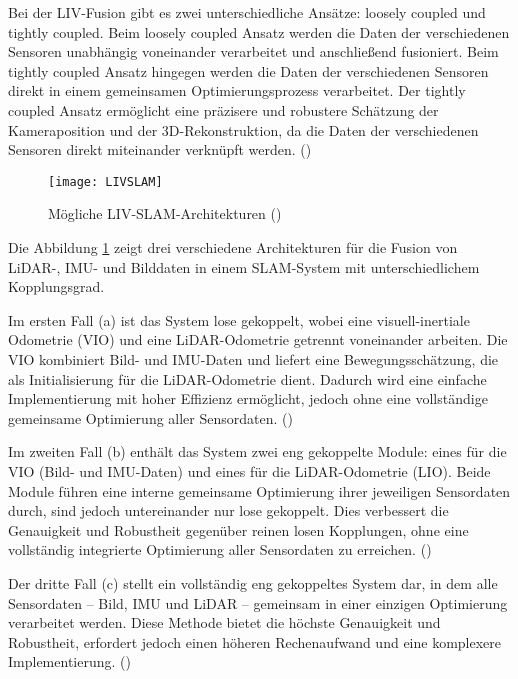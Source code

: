 Bei der LIV-Fusion gibt es zwei unterschiedliche Ansätze: loosely coupled und tightly coupled. Beim loosely coupled Ansatz werden die Daten der verschiedenen Sensoren unabhängig voneinander verarbeitet und anschließend fusioniert. Beim tightly coupled Ansatz hingegen werden die Daten der verschiedenen Sensoren direkt in einem gemeinsamen Optimierungsprozess verarbeitet. Der tightly coupled Ansatz ermöglicht eine präzisere und robustere Schätzung der Kameraposition und der 3D-Rekonstruktion, da die Daten der verschiedenen Sensoren direkt miteinander verknüpft werden. (\cite{zhang2024lidarslam})

\begin{figure}
    \centering
    \texttt{[image: LIVSLAM]}
    \caption{Mögliche LIV-SLAM-Architekturen (\cite{zhang2024lidarslam})\label{fig:LIVSLAM}}\par
\end{figure}

Die Abbildung \ref{fig:LIVSLAM} zeigt drei verschiedene Architekturen für die Fusion von LiDAR-, IMU- und Bilddaten in einem SLAM-System mit unterschiedlichem Kopplungsgrad.

Im ersten Fall (a) ist das System lose gekoppelt, wobei eine visuell-inertiale Odometrie (VIO) und eine LiDAR-Odometrie getrennt voneinander arbeiten. Die VIO kombiniert Bild- und IMU-Daten und liefert eine Bewegungsschätzung, die als Initialisierung für die LiDAR-Odometrie dient. Dadurch wird eine einfache Implementierung mit hoher Effizienz ermöglicht, jedoch ohne eine vollständige gemeinsame Optimierung aller Sensordaten. (\cite{zhang2024lidarslam})

Im zweiten Fall (b) enthält das System zwei eng gekoppelte Module: eines für die VIO (Bild- und IMU-Daten) und eines für die LiDAR-Odometrie (LIO). Beide Module führen eine interne gemeinsame Optimierung ihrer jeweiligen Sensordaten durch, sind jedoch untereinander nur lose gekoppelt. Dies verbessert die Genauigkeit und Robustheit gegenüber reinen losen Kopplungen, ohne eine vollständig integrierte Optimierung aller Sensordaten zu erreichen. (\cite{zhang2024lidarslam})

Der dritte Fall (c) stellt ein vollständig eng gekoppeltes System dar, in dem alle Sensordaten – Bild, IMU und LiDAR – gemeinsam in einer einzigen Optimierung verarbeitet werden. Diese Methode bietet die höchste Genauigkeit und Robustheit, erfordert jedoch einen höheren Rechenaufwand und eine komplexere Implementierung. (\cite{zhang2024lidarslam})

